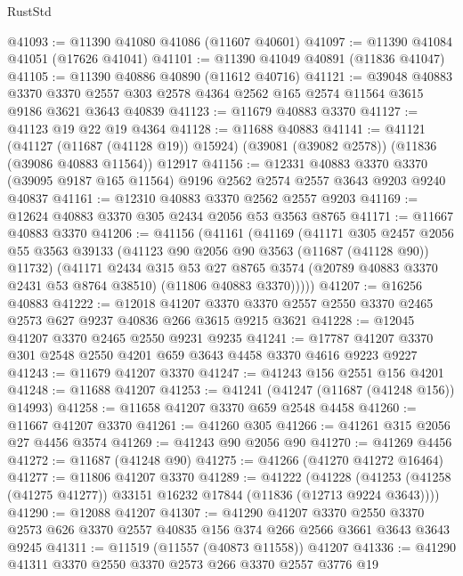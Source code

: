 \begin{lexlean}{RustStd}
\begin{coremodule}
@41093 := @11390 @41080 @41086 (@11607 @40601)
@41097 := @11390 @41084 @41051 (@17626 @41041)
@41101 := @11390 @41049 @40891 (@11836 @41047)
@41105 := @11390 @40886 @40890 (@11612 @40716)
@41121 := @39048
    @40883
    @3370
    @3370
    @2557
    @303
    @2578
    @4364
    @2562
    @165
    @2574
    @11564
    @3615
    @9186
    @3621
    @3643
    @40839
@41123 := @11679 @40883 @3370
@41127 := @41123 @19 @22 @19 @4364
@41128 := @11688 @40883
@41141 := @41121
    (@41127 (@11687 (@41128 @19)) @15924)
    (@39081 (@39082 @2578))
    (@11836 (@39086 @40883 @11564))
    @12917
@41156 := @12331
    @40883
    @3370
    @3370
    (@39095 @9187 @165 @11564)
    @9196
    @2562
    @2574
    @2557
    @3643
    @9203
    @9240
    @40837
@41161 := @12310 @40883 @3370 @2562 @2557 @9203
@41169 := @12624 @40883 @3370 @305 @2434 @2056 @53 @3563 @8765
@41171 := @11667 @40883 @3370
@41206 := @41156
    (@41161
      (@41169
        (@41171
          @305
          @2457
          @2056
          @55
          @3563
          @39133
          (@41123 @90 @2056 @90 @3563 (@11687 (@41128 @90)) @11732)
          (@41171
            @2434
            @315
            @53
            @27
            @8765
            @3574
            (@20789 @40883 @3370 @2431 @53 @8764 @38510)
            (@11806 @40883 @3370)))))
@41207 := @16256 @40883
@41222 := @12018
    @41207
    @3370
    @3370
    @2557
    @2550
    @3370
    @2465
    @2573
    @627
    @9237
    @40836
    @266
    @3615
    @9215
    @3621
@41228 := @12045 @41207 @3370 @2465 @2550 @9231 @9235
@41241 := @17787 @41207 @3370 @301 @2548 @2550 @4201 @659 @3643 @4458 @3370 @4616 @9223 @9227
@41243 := @11679 @41207 @3370
@41247 := @41243 @156 @2551 @156 @4201
@41248 := @11688 @41207
@41253 := @41241 (@41247 (@11687 (@41248 @156)) @14993)
@41258 := @11658 @41207 @3370 @659 @2548 @4458
@41260 := @11667 @41207 @3370
@41261 := @41260 @305
@41266 := @41261 @315 @2056 @27 @4456 @3574
@41269 := @41243 @90 @2056 @90
@41270 := @41269 @4456
@41272 := @11687 (@41248 @90)
@41275 := @41266 (@41270 @41272 @16464)
@41277 := @11806 @41207 @3370
@41289 := @41222
    (@41228 (@41253 (@41258 (@41275 @41277)) @33151 @16232 @17844 (@11836 (@12713 @9224 @3643))))
@41290 := @12088 @41207
@41307 := @41290
    @41207
    @3370
    @2550
    @3370
    @2573
    @626
    @3370
    @2557
    @40835
    @156
    @374
    @266
    @2566
    @3661
    @3643
    @3643
    @9245
@41311 := @11519 (@11557 (@40873 @11558)) @41207
@41336 := @41290
    @41311
    @3370
    @2550
    @3370
    @2573
    @266
    @3370
    @2557
    @3776
    @19

\end{coremodule}
\end{lexlean}
